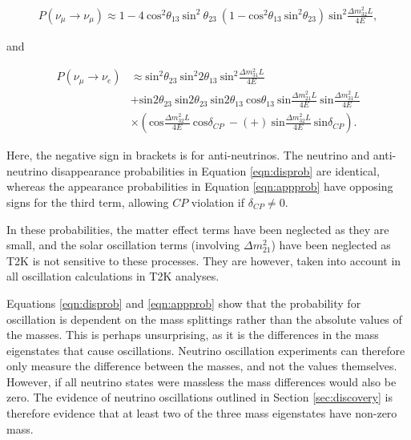 \begin{equation}
\begin{aligned}
P(\nu_\mu \rightarrow \nu_\mu) \approx 1 - 4 \: \text{cos}^2\theta_{13} \: \text{sin}^2 \: \theta_{23} \: (1 - \text{cos}^2\theta_{13} \: \text{sin}^2\theta_{23}) \: \text{sin}^2\frac{\Delta m_{32}^2 L}{4E},
\end{aligned}
\label{eqn:disprob}
\end{equation}

and

\begin{equation}
\begin{aligned}
P(\nu_\mu \rightarrow \nu_e) &\approx \text{sin}^2\theta_{23} \: \text{sin}^2 2\theta_{13} \: \text{sin}^2 \frac{\Delta m_{31}^2 L}{4E}\\
&+\text{sin}2\theta_{23} \: \text{sin}2\theta_{23} \: \text{sin}2\theta_{13} \: \text{cos}\theta_{13} \: \text{sin}\frac{\Delta m_{21}^2 L}{4E} \: \text{sin}\frac{\Delta m_{31}^2 L}{4E}\\
&\times (\text{cos} \frac{\Delta m_{32}^2 L}{4E} \: \text{cos}\delta_{CP} \: - (+) \: \text{sin} \frac{\Delta m_{32}^2 L}{4E} \: \text{sin} \delta_{CP}).
\end{aligned}
\label{eqn:appprob}
\end{equation}

Here, the negative sign in brackets is for anti-neutrinos. The neutrino and anti-neutrino disappearance probabilities in Equation \eqref{eqn:disprob} are identical, whereas the appearance probabilities in Equation \eqref{eqn:appprob} have opposing signs for the third term, allowing $CP$ violation if $\delta_{CP} \neq 0$.

In these probabilities, the matter effect terms have been neglected as they are small, and the solar oscillation terms (involving $\Delta m_{21}^2$) have been neglected as T2K is not sensitive to these processes. They are however, taken into account in all oscillation calculations in T2K analyses.

Equations \ref{eqn:disprob} and \ref{eqn:appprob} show that the probability for oscillation is dependent on the mass splittings rather than the absolute values of the masses. This is perhaps unsurprising, as it is the differences in the mass eigenstates that cause oscillations.  Neutrino oscillation experiments can therefore only measure the difference between the masses, and not the values themselves. However, if all neutrino states were massless the mass differences would also be zero. The evidence of neutrino oscillations outlined in Section \ref{sec:discovery} is therefore evidence that at least two of the three mass eigenstates have non-zero mass. 

